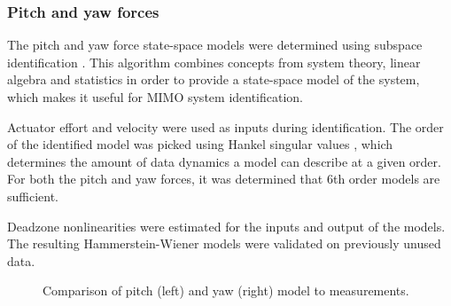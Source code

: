 \subsubsection{Pitch and yaw forces}
The pitch and yaw force state-space models were determined using subspace identification  \cite{van2012subspace}. This algorithm combines concepts from system theory, linear algebra and statistics in order to provide a state-space model of the system, which makes it useful for MIMO system identification. 

Actuator effort and velocity were used as inputs during identification.
The order of the identified model was picked using Hankel singular values \cite{gawronski1990model}, which determines the amount of data dynamics a model can describe at a given order. For both the pitch and yaw forces, it was determined that 6th order models are sufficient. 

Deadzone nonlinearities were estimated for the inputs and output of the models. 
The resulting Hammerstein-Wiener models were validated on previously unused data.

 \begin{figure}[h]
 \centering
 \caption{Comparison of pitch (left) and yaw (right) model to measurements.}
 \label{fig:final_res_yaw}
 \end{figure}




